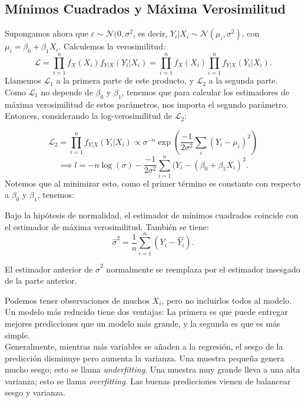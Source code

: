 \subsection{Mínimos Cuadrados y Máxima Verosimilitud}
Supongamos ahora que $\varepsilon \sim \mathcal{N}(0,\sigma^2$, es decir, 
$Y_i|X_i \sim \mathcal{N}(\mu_i,\sigma^2)$, con $\mu_i=\beta_0 + \beta_1 X_i$.
Calculemos la verosimilitud: 
$$
\mathcal{L}=\prod_{i=1}^{n}f_{X}(X_i) f_{Y|X}(Y_i|X_i)= \prod_{i=1}^{n}f_{X}(X_i) \prod_{i=1}^{n}f_{Y|X}(Y_i|X_i).
$$
Llamemos $\mathcal{L}_1$ a la primera parte de este producto, y $\mathcal{L}_2$ a la segunda parte. Como $\mathcal{L}_1$ no depende de $\beta_0 $ y $\beta_1$, tenemos que para calcular los estimadores de máxima verosimilitud de estos parámetros, nos importa el segundo parámetro. Entonces, considerando la log-verosimilitud de $\mathcal{L}_2$:

$$ \mathcal{L}_2 = \prod_{i=1}^{n} f_{Y|X}(Y_i|X_i) \propto \sigma^{-n} \exp(\dfrac{-1}{2\sigma^2}\sum_{i} (Y_i-\mu_i)^2) 
$$ 
$$
\implies l=-n\log(\sigma)-\dfrac{-1}{2\sigma^2}\sum_{i=1}^{n}(Y_i-(\beta_0 + \beta_1 X_i)^2.
$$
Notemos que al minimizar esto, como el primer término es constante con respecto a $\beta_0 $ y $\beta_1$, tenemos: 
\begin{theorem}
Bajo la hipótesis de normalidad, el estimador de mínimos cuadrados coincide con el estimador de máxima verosimilitud. También se tiene: 
$$
\hat{\sigma}^2=\dfrac{1}{n} \sum_{i=1}^{n}(Y_i-\hat{Y_i}).
$$
\end{theorem}
\begin{remark}
El estimador anterior de $\hat{\sigma}^2$ normalmente se reemplaza por el estimador insesgado de la parte anterior. 
\end{remark}



\begin{remark} Podemos tener observaciones de muchos $X_i$, pero no incluirlos todos al modelo. Un modelo más reducido tiene dos ventajas: La primera es que puede entregar mejores predicciones que un modelo más grande, y la segunda es que es más simple.\\  
Generalmente, mientras más variables se añaden a la regresión, el sesgo de la predicción disminuye pero aumenta la varianza. Una muestra pequeña genera mucho sesgo; esto se llama \emph{underfitting}. Una muestra muy grande lleva a una alta varianza; esto se llama \emph{overfitting}. Las buenas predicciones vienen de balancear sesgo y varianza. 
\end{remark}

